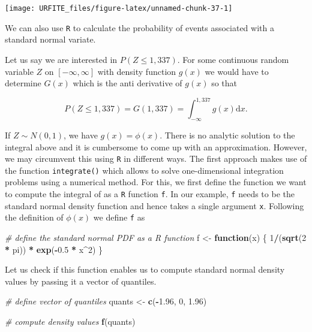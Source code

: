 \documentclass[]{book}
\newenvironment{Shaded}{\begin{snugshade}}{\end{snugshade}}
\newcommand{\KeywordTok}[1]{\textcolor[rgb]{0.13,0.29,0.53}{\textbf{#1}}}
\newcommand{\DecValTok}[1]{\textcolor[rgb]{0.00,0.00,0.81}{#1}}
\newcommand{\FloatTok}[1]{\textcolor[rgb]{0.00,0.00,0.81}{#1}}
\newcommand{\StringTok}[1]{\textcolor[rgb]{0.31,0.60,0.02}{#1}}
\newcommand{\CommentTok}[1]{\textcolor[rgb]{0.56,0.35,0.01}{\textit{#1}}}
\newcommand{\ControlFlowTok}[1]{\textcolor[rgb]{0.13,0.29,0.53}{\textbf{#1}}}
\newcommand{\OperatorTok}[1]{\textcolor[rgb]{0.81,0.36,0.00}{\textbf{#1}}}
\newcommand{\NormalTok}[1]{#1}
\theoremstyle{definition}
\theoremstyle{definition}
\theoremstyle{definition}
\theoremstyle{remark}
\begin{document}
\begin{center}\texttt{[image: URFITE\_files/figure-latex/unnamed-chunk-37-1]} \end{center}

We can also use \texttt{R} to calculate the probability of events
associated with a standard normal variate.

Let us say we are interested in \(P(Z \leq 1,337)\). For some continuous
random variable \(Z\) on \([-\infty,\infty]\) with density function
\(g(x)\) we would have to determine \(G(x)\) which is the anti
derivative of \(g(x)\) so that

\[ P(Z \leq 1,337 ) = G(1,337) = \int_{-\infty}^{1,337} g(x) \mathrm{d}x.  \]

If \(Z \sim N(0,1)\), we have \(g(x)=\phi(x)\). There is no analytic
solution to the integral above and it is cumbersome to come up with an
approximation. However, we may circumvent this using \texttt{R} in
different ways. The first approach makes use of the function
\texttt{integrate()} which allows to solve one-dimensional integration
problems using a numerical method. For this, we first define the
function we want to compute the integral of as a \texttt{R} function
\texttt{f}. In our example, \texttt{f} needs to be the standard normal
density function and hence takes a single argument \texttt{x}. Following
the definition of \(\phi(x)\) we define \texttt{f} as

\begin{Shaded}
\begin{Highlighting}[]
\CommentTok{# define the standard normal PDF as a R function}
\NormalTok{f <-}\StringTok{ }\ControlFlowTok{function}\NormalTok{(x) \{}
  \DecValTok{1}\OperatorTok{/}\NormalTok{(}\KeywordTok{sqrt}\NormalTok{(}\DecValTok{2} \OperatorTok{*}\StringTok{ }\NormalTok{pi)) }\OperatorTok{*}\StringTok{ }\KeywordTok{exp}\NormalTok{(}\OperatorTok{-}\FloatTok{0.5} \OperatorTok{*}\StringTok{ }\NormalTok{x}\OperatorTok{^}\DecValTok{2}\NormalTok{)}
\NormalTok{\}}
\end{Highlighting}
\end{Shaded}

Let us check if this function enables us to compute standard normal
density values by passing it a vector of quantiles.

\begin{Shaded}
\begin{Highlighting}[]
\CommentTok{# define vector of quantiles}
\NormalTok{quants <-}\StringTok{ }\KeywordTok{c}\NormalTok{(}\OperatorTok{-}\FloatTok{1.96}\NormalTok{, }\DecValTok{0}\NormalTok{, }\FloatTok{1.96}\NormalTok{)}

\CommentTok{# compute density values}
\KeywordTok{f}\NormalTok{(quants)}
\end{Highlighting}
\end{Shaded}
\end{document}
